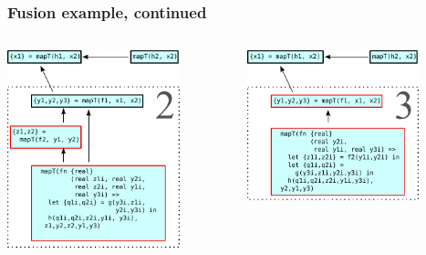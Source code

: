 \documentclass{beamer}
\begin{document}
\begin{frame}[t]
  \frametitle{Fusion example, continued}

  \centering
  \begin{columns}
    \begin{column}[T]{0.48\textwidth}
      \includegraphics[width=5cm]{img/fusion-2.pdf}
    \end{column}\hfill
    \begin{column}[T]{0.48\textwidth}
      \includegraphics[width=5cm]{img/fusion-3.pdf}
    \end{column}
  \end{columns}

\end{frame}
\end{document}
